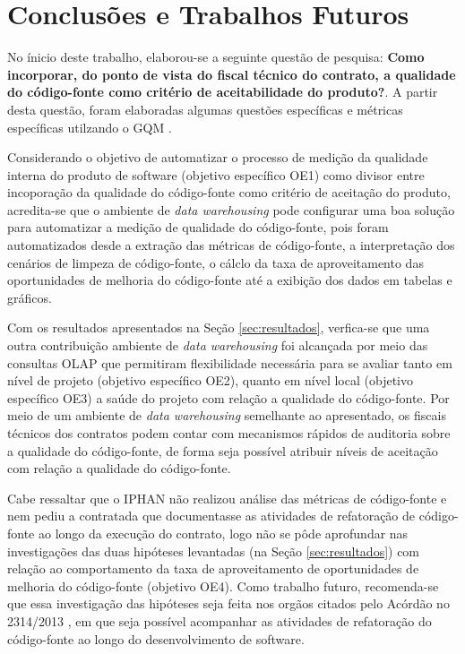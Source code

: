 \section{Conclusões e Trabalhos Futuros}

No ínicio deste trabalho, elaborou-se a seguinte questão de pesquisa: \textbf{Como incorporar, do ponto de vista do fiscal técnico do contrato, a qualidade do código-fonte como critério de aceitabilidade do produto?}. A partir desta questão, foram elaboradas algumas questões específicas e métricas específicas utilzando o GQM \cite{Basili96b}.

Considerando o objetivo de automatizar o processo de medição da qualidade interna do produto de software (objetivo específico OE1) como divisor entre incoporação da qualidade do código-fonte como critério de aceitação do produto, acredita-se que o ambiente de \textit{data warehousing} pode configurar uma boa solução para automatizar a medição de qualidade do código-fonte, pois foram automatizados  desde a extração das métricas de código-fonte, a interpretação dos cenários de limpeza de código-fonte, o cálclo da taxa de aproveitamento das oportunidades de melhoria do código-fonte até a exibição dos dados em tabelas e gráficos.

Com os resultados apresentados na Seção \ref{sec:resultados}, verfica-se que uma outra contribuição ambiente de \textit{data warehousing} foi alcançada por meio das consultas OLAP que permitiram flexibilidade necessária para se avaliar tanto em nível de projeto (objetivo específico OE2), quanto em nível local (objetivo específico OE3) a saúde do projeto com relação a qualidade do código-fonte. Por meio de um ambiente de \textit{data warehousing} semelhante ao apresentado, os fiscais técnicos dos contratos podem contar com mecanismos rápidos de auditoria sobre a qualidade do código-fonte, de forma seja possível atribuir níveis de aceitação com relação a qualidade do código-fonte. 

Cabe ressaltar que o IPHAN não realizou análise das métricas de código-fonte e nem pediu a contratada que documentasse as atividades de refatoração de código-fonte ao longo da execução do contrato, logo não se pôde aprofundar nas investigações das duas hipóteses levantadas (na Seção \ref{sec:resultados}) com relação ao comportamento da taxa de aproveitamento de oportunidades de melhoria do código-fonte (objetivo OE4). Como trabalho futuro, recomenda-se que essa investigação das hipóteses seja feita nos orgãos citados pelo Acórdão no 2314/2013 \cite{TCU:2013}, em que seja possível acompanhar as atividades de refatoração do código-fonte ao longo do desenvolvimento de software.
